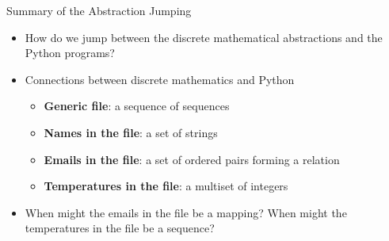 \documentclass[14pt,aspectratio=169]{beamer}
\begin{document}
%
\begin{frame}{Summary of the Abstraction Jumping}
  \begin{itemize}
    \item How do we jump between the discrete mathematical abstractions and the
      Python programs?
      \vspace*{-.15in}
    \item Connections between discrete mathematics and Python
      \begin{itemize}
        \item {\bf Generic file}: a sequence of sequences
        \item {\bf Names in the file}: a set of strings
        \item {\bf Emails in the file}: a set of ordered pairs forming a
          relation
        \item {\bf Temperatures in the file}: a multiset of integers
      \end{itemize}
      \vspace*{-.2in}
    \item When might the emails in the file be a mapping? When might the
      temperatures in the file be a sequence?
  \end{itemize}
\end{frame}
\end{document}
